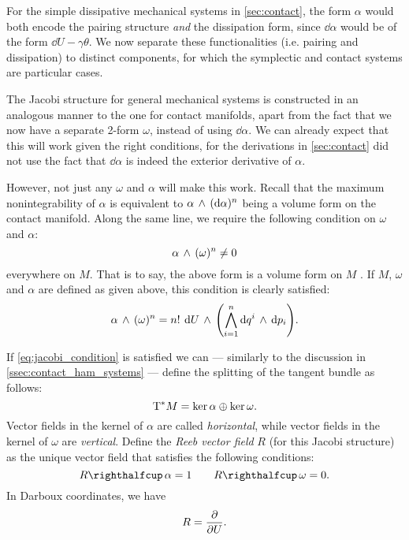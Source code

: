 For the simple dissipative mechanical systems in \cref{sec:contact}, the form \(\alpha\) would both encode the pairing structure \emph{and} the dissipation form, since \(\dd{\alpha}\) would be of the form \(\dd{U} - \gamma \theta\).  We now separate these functionalities (i.e. pairing and dissipation) to distinct components, for which the symplectic and contact systems are particular cases.

The Jacobi structure for general mechanical systems is constructed in an analogous manner to the one for contact manifolds, apart from the fact that we now have a separate 2-form \(\omega\), instead of using \(\dd{\alpha}\). We can already expect that this will work given the right conditions, for the derivations in \cref{sec:contact} did not use the fact that \(\dd{\alpha}\) is indeed the exterior derivative of \(\alpha\). 

However, not just any \(\omega\) and \(\alpha\) will make this work. Recall that the maximum nonintegrability of \(\alpha\) is equivalent to \( \alpha\,\wedge\,(\dd{\alpha})^n \) being a volume form on the contact manifold. Along the same line, we require the following condition on \(\omega\) and \(\alpha\):
\begin{equation}
     \alpha\,\wedge\,(\omega)^n  \neq 0
    \label{eq:jacobi_condition}
\end{equation}
everywhere on \(M\). That is to say, the above form is a volume form on \(M\) \cite{ciaglia2018}. If \(M\), \(\omega\) and \(\alpha\) are defined as given above, this condition is clearly satisfied:
\begin{equation}
      \alpha\,\wedge\,(\omega)^n  = n!\: \dd{U}\,\wedge\,\qty(\bigwedge_{i=1}^{n} \dd{q^i}\,\wedge\,\dd{p_i} ) .
\end{equation}

If \cref{eq:jacobi_condition} is satisfied we can --- similarly to the discussion in \cref{ssec:contact_ham_systems} --- define the splitting of the tangent bundle as follows:
\begin{equation}
     \mathrm{T}^*M = \ker{\alpha}\oplus\ker{\omega}.
\end{equation}
Vector fields in the kernel of \(\alpha\) are called \emph{horizontal}, while vector fields in the kernel of \(\omega\) are \emph{vertical}. Define the \emph{Reeb vector field} \(R\) (for this Jacobi structure) as the unique vector field that satisfies the following conditions:
\begin{equation}
     \intpr{R}{\alpha} = 1 \qquad \intpr{R}{\omega} = 0.
\end{equation}
In Darboux coordinates, we have
\begin{equation}
     R = \pdv{}{U}.
\end{equation}

